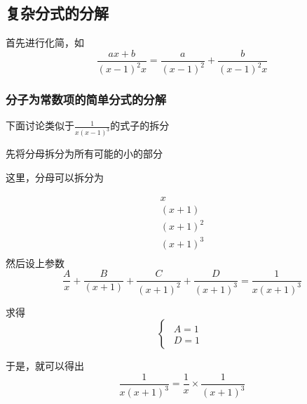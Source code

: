 \documentclass[a4paper]{ctexart}
\begin{document}
\begin{multicols}{2}
\subsection{复杂分式的分解}
\par 首先进行化简，如
\begin{equation}
\frac{
    ax+b
}
{(x-1)^2x}
=
\frac{a}{(x-1)^2}
+
\frac{b}{(x-1)^2x}
\end{equation}
\subsubsection{分子为常数项的简单分式的分解}
\par 下面讨论类似于$\frac{1}{x(x-1)^3}$的式子的拆分
\par 先将分母拆分为所有可能的小的部分
\par 这里，分母可以拆分为

\begin{equation}
\begin{array}{l}
x\\
(x+1)\\
(x+1)^2\\
(x+1)^3\\
\end{array}
\end{equation}
然后设上参数
\begin{equation}
\frac{A}{x}+
\frac{B}{(x+1)}+
\frac{C}{(x+1)^2}+
\frac{D}{(x+1)^3}
=
\frac{1}
{x(x+1)^3}
\end{equation}
\par 求得
\begin{equation}
\begin{cases}
\begin{array}{l}
A = 1\\
D = 1 
\end{array}
\end{cases}
\end{equation}
\par 于是，就可以得出
\begin{equation}
\frac{1}
{x(x+1)^3}
=
\frac{1}{x} \times
\frac{1}{(x+1)^3}
\end{equation}

\end{multicols}
\end{document}
